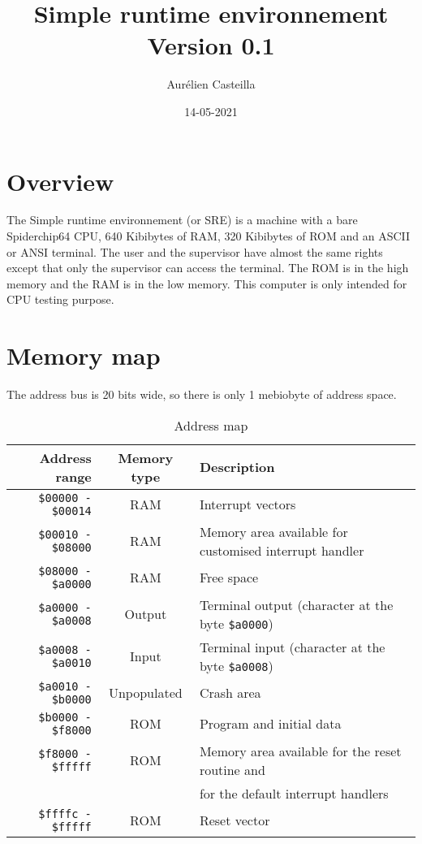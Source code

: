 \documentclass[11pt]{article}
\author{Aurélien Casteilla}
\title{Simple runtime environnement \\[1ex] \large Version 0.1}
\date{14-05-2021}
\begin{document}
\maketitle
\newpage

\section{Overview}
The Simple runtime environnement (or SRE) is a machine with a bare Spiderchip64
CPU, 640 Kibibytes of RAM, 320 Kibibytes of ROM and an ASCII or ANSI terminal.
The user and the supervisor have almost the same rights except that only the
supervisor can access the terminal. The ROM is in the high memory and the RAM
is in the low memory. This computer is only intended for CPU testing purpose.

\section{Memory map}

The address bus is 20 bits wide, so there is only 1 mebiobyte of address space.

\begin{table}[h!]
    \begin{center}
        \caption{Address map}
        \label{tab:addmap}
        \begin{tabular}{|r|c|l|}
            \hline
            Address range & Memory type & Description \\
            \hline
            \texttt{\$00000 - \$00014} & RAM & Interrupt vectors \\
            \hline
            \texttt{\$00010 - \$08000} & RAM & Memory area available for customised
            interrupt handler \\
            \hline
            \texttt{\$08000 - \$a0000} & RAM & Free space \\
            \hline
            \texttt{\$a0000 - \$a0008} & Output & Terminal output (character
            at the byte \texttt{\$a0000})\\
            \hline
            \texttt{\$a0008 - \$a0010} & Input & Terminal input (character at the byte
            \texttt{\$a0008}) \\ 
            \hline
            \texttt{\$a0010 - \$b0000} & Unpopulated & Crash area \\
            \hline
            \texttt{\$b0000 - \$f8000} & ROM & Program and initial data \\
            \hline
            \texttt{\$f8000 - \$fffff} & ROM & Memory area available for the reset
            routine and \\
            & & for the default interrupt handlers \\
            \hline
            \texttt{\$ffffc - \$fffff} & ROM & Reset vector \\
            \hline
        \end{tabular}
    \end{center}
\end{table}
\end{document}
